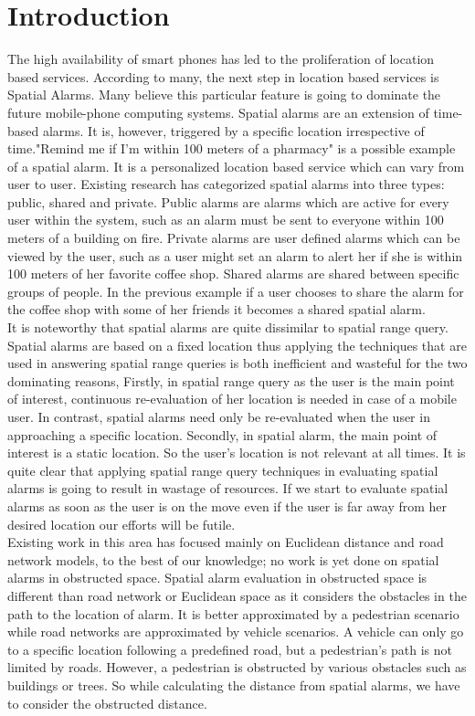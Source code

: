 \documentclass{sig-alternate}
\begin{document}
\section{Introduction}
The high availability of smart phones has led to the proliferation of location based services. According to many, the next step in location based services is Spatial Alarms. Many believe this particular feature is going to dominate the future mobile-phone computing systems. Spatial alarms are an extension of time-based alarms. It is, however, triggered by a specific location irrespective of time."Remind me if I'm within 100 meters of a pharmacy" is a possible example of a spatial alarm. It is a personalized location based service which can vary from user to user. Existing research has categorized spatial alarms into three types: public, shared and private. Public alarms are alarms which are active for every user within the system, such as an alarm must be sent to everyone within 100 meters of a building on fire. Private alarms are user defined alarms which can be viewed by the user, such as a user might set an alarm to alert her if she is within 100 meters of her favorite coffee shop. Shared alarms are shared between specific groups of people. In the previous example if a user chooses to share the alarm for the coffee shop with some of her friends it becomes a shared spatial alarm.\\
It is noteworthy that spatial alarms are quite dissimilar to spatial range query. Spatial alarms are based on a fixed location thus applying the techniques that are used in answering spatial range queries is both inefficient and wasteful for the two dominating reasons, Firstly, in spatial range query as the user is the main point of interest, continuous re-evaluation of her location is needed in case of a mobile user. In contrast, spatial alarms need only be re-evaluated when the user in approaching a specific location. Secondly, in spatial alarm, the main point of interest is a static location. So the user's location is not relevant at all times. It is quite clear that applying spatial range query techniques in evaluating spatial alarms is going to result in wastage of resources. If we start to evaluate spatial alarms as soon as the user is on the move even if the user is far away from her desired location our efforts will be futile. \\
Existing work in this area has focused mainly on Euclidean distance and road network models, to the best of our knowledge; no work is yet done on spatial alarms in obstructed space. Spatial alarm evaluation in obstructed space is different than road network or Euclidean space as it considers the obstacles in the path to the location of alarm. It is better approximated by a pedestrian scenario while road networks are approximated by vehicle scenarios. A vehicle can only go to a specific location following a predefined road, but a pedestrian's path is not limited by roads. However, a pedestrian is obstructed by various obstacles such as buildings or trees. So while calculating the distance from spatial alarms, we have to consider the obstructed distance.\\
\end{document}
